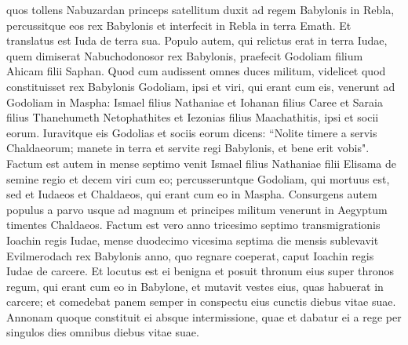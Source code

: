 \begin{biblechapter}
\verse quos tollens Nabuzardan princeps satellitum duxit ad regem Babylonis in Rebla, 
\verse percussitque eos rex Babylonis et interfecit in Rebla in terra Emath. Et translatus est Iuda de terra sua. 
\verse Populo autem, qui relictus erat in terra Iudae, quem dimiserat Nabuchodonosor rex Babylonis, praefecit Godoliam filium Ahicam filii Saphan. 
\verse Quod cum audissent omnes duces militum, videlicet quod constituisset rex Babylonis Godoliam, ipsi et viri, qui erant cum eis, venerunt ad Godoliam in Maspha: Ismael filius Nathaniae et Iohanan filius Caree et Saraia filius Thanehumeth Netophathites et Iezonias filius Maachathitis, ipsi et socii eorum. 
\verse Iuravitque eis Godolias et sociis eorum dicens: “Nolite timere a servis Chaldaeorum; manete in terra et servite regi Babylonis, et bene erit vobis". 
\verse Factum est autem in mense septimo venit Ismael filius Nathaniae filii Elisama de semine regio et decem viri cum eo; percusseruntque Godoliam, qui mortuus est, sed et Iudaeos et Chaldaeos, qui erant cum eo in Maspha. 
\verse Consurgens autem populus a parvo usque ad magnum et principes militum venerunt in Aegyptum timentes Chaldaeos. 
\verse Factum est vero anno tricesimo septimo transmigrationis Ioachin regis Iudae, mense duodecimo vicesima septima die mensis sublevavit Evilmerodach rex Babylonis anno, quo regnare coeperat, caput Ioachin regis Iudae de carcere.  
\verse Et locutus est ei benigna et posuit thronum eius super thronos regum, qui erant cum eo in Babylone, 
\verse et mutavit vestes eius, quas habuerat in carcere; et comedebat panem semper in conspectu eius cunctis diebus vitae suae.  
\verse Annonam quoque constituit ei absque intermissione, quae et dabatur ei a rege per singulos dies omnibus diebus vitae suae.     
\end{biblechapter}
